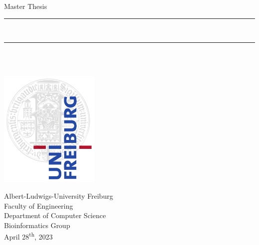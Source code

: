 
\begin{titlepage}
\begin{center}

\newcommand{\HorizontalLine}{\rule{\linewidth}{0.3mm}}

{\Large Master Thesis}\\[0.4cm]


\HorizontalLine \\[0.4cm]
{ \huge \bfseries \thetitle }
\HorizontalLine \\[1.8cm]


{\Huge \theauthor} \\[2.6cm]



\vfill

\includegraphics*[width=0.36\textwidth]{media/0_0-uni-logo.png}


\Large {
    Albert-Ludwigs-University Freiburg\\
    Faculty of Engineering\\
    Department of Computer Science\\
    Bioinformatics Group\\

    April 28\textsuperscript{th}, 2023\\
}
\end{center}
\end{titlepage}

